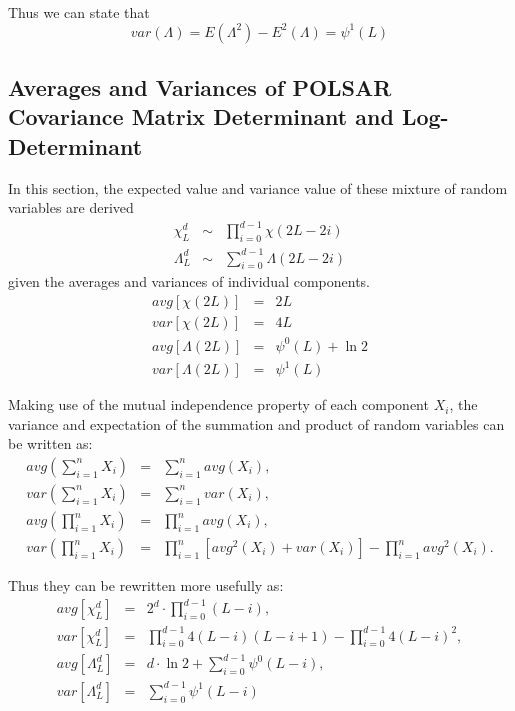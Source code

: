 \documentclass[journal]{IEEEtran}
\begin{document}
Thus we can state that
\begin{equation}
var(\Lambda)=E(\Lambda^2)-E^2(\Lambda)=\psi^1(L)
\end{equation}

\subsection{Averages and Variances of POLSAR Covariance Matrix Determinant and Log-Determinant}

In this section, the expected value and variance value of these mixture of random variables are derived
\begin{eqnarray}
\chi^d_L &\sim& \prod_{i=0}^{d-1} \chi (2L-2i) \\
\Lambda^d_L &\sim& \sum_{i=0}^{d-1} \Lambda (2L-2i)
\end{eqnarray}
given the averages and variances of individual components.
\begin{eqnarray}
avg \left[ \chi(2L) \right]&=&2L \\
var \left[ \chi(2L) \right]&=&4L \\
avg \left[ \Lambda(2L) \right] &=& \psi^0(L) + \ln2 \\
var \left[ \Lambda(2L) \right] &=& \psi^1(L)
\end{eqnarray}

Making use of the mutual independence property of each component $X_i$,
  the variance and expectation of the summation and product of random variables can be written as:
\begin{eqnarray*}
avg \left( \sum^n_{i=1} X_i \right) &=& \sum^n_{i=1} avg(X_i), \\
var \left( \sum^n_{i=1} X_i \right) &=& \sum^n_{i=1} var(X_i), \\
avg \left( \prod^n_{i=1} X_i \right) &=& \prod^n_{i=1} avg(X_i), \\ 
var \left( \prod^n_{i=1} X_i \right) &=& \prod^n_{i=1} \left[ avg^2(X_i) + var(X_i) \right] - \prod^n_{i=1} avg^2(X_i).    
\end{eqnarray*}

Thus they can be rewritten more usefully as:
\begin{eqnarray*}
  avg \left[ \chi^d_L \right] &=& 2^d \cdot \prod^{d-1}_{i=0} (L-i), \\
  var \left[ \chi^d_L \right] &=& \prod^{d-1}_{i=0} 4(L-i)(L-i+1) - \prod^{d-1}_{i=0} 4(L-i)^2, \\
  avg \left[ \Lambda^d_L \right] &=& d \cdot \ln{2} + \sum^{d-1}_{i=0} \psi^0(L-i), \\
  var \left[ \Lambda^d_L \right] &=& \sum^{d-1}_{i=0} \psi^1(L-i)
\end{eqnarray*}
\end{document}
